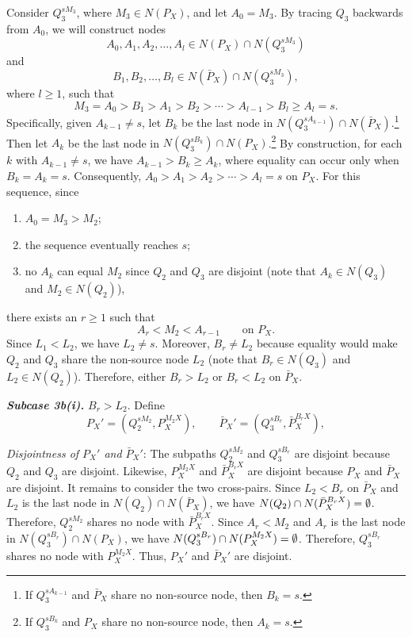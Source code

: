 \documentclass[11pt]{article}
\begin{document}
Consider \(Q_3^{sM_3}\), where \(M_3\in N(P_X)\), and let \(A_0=M_3\). By tracing \(Q_3\) backwards from \(A_0\), we will construct nodes
\[
A_0,A_1,A_2,\ldots,A_l\in N(P_X)\cap N(Q_3^{sM_3})\]
and
\[
B_1,B_2,\ldots,B_l\in N(\bar P_X)\cap N(Q_3^{sM_3}),
\]
where \(l\ge 1\), such that
\[
M_3=A_0>B_1>A_1>B_2>\cdots > A_{l-1}>B_l\ge A_l =s.
\]
Specifically, given \(A_{k-1}\neq s\), let \(B_k\) be the last node in \(N(Q_3^{sA_{k-1}})\cap N(\bar P_X)\).\footnote{If \(Q_3^{sA_{k-1}}\) and \(\bar P_X\) share no non-source node, then \(B_k=s\).}  Then let \(A_k\) be the last node in \(N(Q_3^{sB_k})\cap N(P_X)\).\footnote{If \(Q_3^{sB_k}\) and \(P_X\) share no non-source node, then \(A_k=s\).}  By construction, for each \(k\) with \(A_{k-1}\neq s\), we have \(A_{k-1}>B_k\ge A_k\), where equality can occur only when \(B_k=A_k=s\). Consequently, \(A_0>A_1>A_2>\cdots > A_l=s\) on \(P_X\).
For this sequence, since
\begin{enumerate}
    \item \(A_0=M_3>M_2\);
    \item the sequence eventually reaches \(s\);
    \item no \(A_k\) can equal \(M_2\) since \(Q_2\) and \(Q_3\) are disjoint (note that \(A_k \in N(Q_3)\) and \(M_2\in N(Q_2)\)),
\end{enumerate}
there exists an \(r\ge 1\) such that
\[
A_r<M_2<A_{r-1}
\qquad\text{on }P_X.
\]
Since \(L_1<L_2\), we have \(L_2\neq s\). Moreover, \(B_r\neq L_2\) because equality would make \(Q_2\) and \(Q_3\) share the non-source node \(L_2\) (note that \(B_r\in N(Q_3)\) and \(L_2\in N(Q_2)\)). Therefore, either \(B_r>L_2\) or \(B_r<L_2\) on \(\bar P_X\).

\par\vspace{0.4em}
\noindent\textbf{\emph{Subcase 3b(i).}}
\(B_r>L_2\). Define
\[
P_X'=(Q_2^{sM_2},P_X^{M_2X}),
\qquad
\bar P_X'=(Q_3^{sB_r},\bar P_X^{B_rX}),
\]
\par\vspace{0.4em}
\noindent\emph{Disjointness of \(P_X'\) and \(\bar P_X'\)}:
The subpaths \(Q_2^{sM_2}\) and \(Q_3^{sB_r}\) are disjoint because \(Q_2\) and \(Q_3\) are disjoint. Likewise, \(P_X^{M_2X}\) and \(\bar P_X^{B_rX}\) are disjoint because \(P_X\) and \(\bar P_X\) are disjoint. It remains to consider the two cross-pairs. Since \(L_2<B_r\) on \(\bar{P}_X\) and \(L_2\) is the last node in \(N(Q_2)\cap N(\bar P_X)\), we have \(N(Q_2)\cap N(\bar P_X^{B_rX})=\nobreak\emptyset\). Therefore, \(Q_2^{sM_2}\) shares no node with \(\bar P_X^{B_rX}\). Since \(A_r<M_2\) and \(A_r\) is the last node in \(N(Q_3^{sB_r})\cap N(P_X)\), we have \(N(Q_3^{sB_r})\cap N(P_X^{M_2X})=\nobreak\emptyset\). Therefore, \(Q_3^{sB_r}\) shares no node with \(P_X^{M_2X}\). Thus, \(P_X'\) and \(\bar P_X'\) are disjoint.
\end{document}
